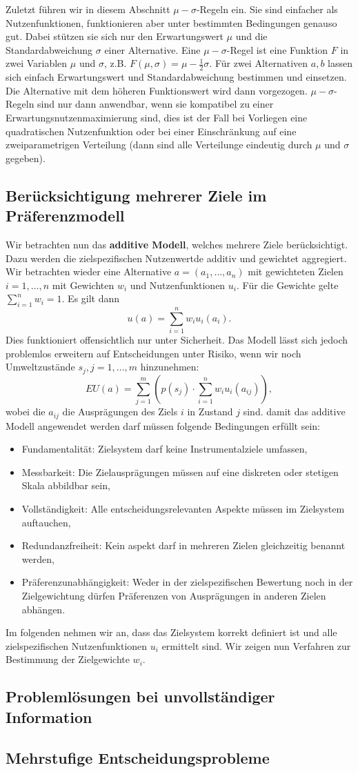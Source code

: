 Zuletzt führen wir in diesem Abschnitt \(\mu-\sigma\)-Regeln ein. Sie sind einfacher als Nutzenfunktionen, funktionieren aber unter bestimmten Bedingungen genauso gut. Dabei stützen sie sich nur den Erwartungswert \(\mu\) und die Standardabweichung \(\sigma\) einer Alternative. Eine \(\mu-\sigma\)-Regel ist eine Funktion \(F\) in zwei Variablen \(\mu\) und \(\sigma\), z.B. \(F(\mu, \sigma) = \mu - \frac{1}{2}\sigma\). Für zwei Alternativen \(a, b\) lassen sich einfach Erwartungswert und Standardabweichung bestimmen und einsetzen. Die Alternative mit dem höheren Funktionswert wird dann vorgezogen. \(\mu-\sigma\)-Regeln sind nur dann anwendbar, wenn sie kompatibel zu einer Erwartungsnutzenmaximierung sind, dies ist der Fall bei Vorliegen eine quadratischen Nutzenfunktion oder bei einer Einschränkung auf eine zweiparametrigen Verteilung (dann sind alle Verteilunge eindeutig durch \(\mu\) und \(\sigma\) gegeben).

\subsection{Berücksichtigung mehrerer Ziele im Präferenzmodell}
Wir betrachten nun das \textbf{additive Modell}, welches mehrere Ziele berücksichtigt. Dazu werden die zielspezifischen Nutzenwertde additiv und gewichtet aggregiert.\\
Wir betrachten wieder eine Alternative \(a = (a_1, \ldots, a_n)\) mit gewichteten Zielen \(i=1,\ldots,n\) mit Gewichten \(w_i\) und Nutzenfunktionen \(u_i\). Für die Gewichte gelte \(\sum_{i=1}^n w_i = 1\). Es gilt dann
\[
	u(a) = \sum_{i=1}^n w_iu_i(a_i).
\]
Dies funktioniert offensichtlich nur unter Sicherheit. Das Modell lässt sich jedoch problemlos erweitern auf Entscheidungen unter Risiko, wenn wir noch Umweltzustände \(s_j, j=1,\ldots,m\) hinzunehmen:
\[
	EU(a) = \sum_{j=1}^m \left( p(s_j) \cdot \sum_{i=1}^n w_iu_i(a_{ij})\right),
\]
wobei die \(a_{ij}\) die Ausprägungen des Ziels \(i\) in Zustand \(j\) sind. damit das additive Modell angewendet werden darf müssen folgende Bedingungen erfüllt sein:
\begin{itemize}
	\item Fundamentalität: Zielsystem darf keine Instrumentalziele umfassen,
	\item Messbarkeit: Die Zielausprägungen müssen auf eine diskreten oder stetigen Skala abbildbar sein,
	\item Vollständigkeit: Alle entscheidungsrelevanten Aspekte müssen im Zielsystem auftauchen,
	\item Redundanzfreiheit: Kein aspekt darf in mehreren Zielen gleichzeitig benannt werden,
	\item Präferenzunabhängigkeit: Weder in der zielspezifischen Bewertung noch in der Zielgewichtung dürfen Präferenzen von Ausprägungen in anderen Zielen abhängen.
\end{itemize}
Im folgenden nehmen wir an, dass das Zielsystem korrekt definiert ist und alle zielspezifischen Nutzenfunktionen \(u_i\) ermittelt sind. Wir zeigen nun Verfahren zur Bestimmung der Zielgewichte \(w_i\).
\subsection{Problemlösungen bei unvollständiger Information}

\subsection{Mehrstufige Entscheidungsprobleme}
